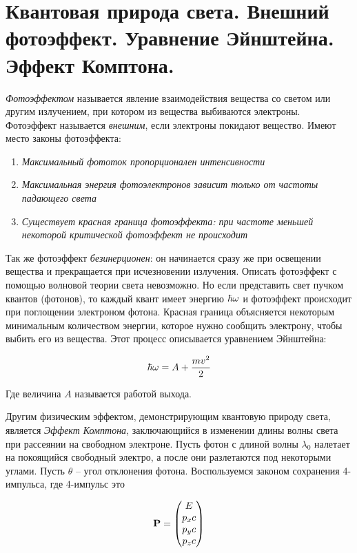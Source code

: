 \section{Квантовая природа света. Внешний фотоэффект. Уравнение Эйнштейна. Эффект Комптона.}

\textit{Фотоэффектом} называется явление взаимодействия вещества со светом или другим излучением, при котором из вещества выбиваются электроны. Фотоэффект называется \textit{внешним}, если электроны покидают вещество. Имеют место законы фотоэффекта:

\begin{enumerate}
    \item \textit{Максимальный фототок пропорционален интенсивности}
    \item \textit{Максимальная энергия фотоэлектронов зависит только от частоты падающего света}
    \item \textit{Существует красная граница фотоэффекта: при частоте меньшей некоторой критической фотоэффект не происходит}
\end{enumerate}

Так же фотоэффект \textit{безинерционен}: он начинается сразу же при освещении вещества и прекращается при исчезновении излучения. Описать фотоэффект с помощью волновой теории света невозможно. Но если представить свет пучком квантов (фотонов), то каждый квант имеет энергию $\hbar \omega$ и фотоэффект происходит при поглощении электроном фотона. Красная граница объясняется некоторым минимальным количеством энергии, которое нужно сообщить электрону, чтобы выбить его из вещества. Этот процесс описывается уравнением Эйнштейна:

\begin{equation}
    \hbar \omega = A + \frac{m v^2}{2}
\end{equation}

\noindent
Где величина $A$ называется работой выхода.

Другим физическим эффектом, демонстрирующим квантовую природу света, является \textit{Эффект Комптона}, заключающийся в изменении длины волны света при рассеянии на свободном электроне. Пусть фотон с длиной волны $\lambda_0$ налетает на покоящийся свободный электро, а после они разлетаются под некоторыми углами. Пусть $\theta$ -- угол отклонения фотона. Воспользуемся законом сохранения 4-импульса, где 4-импульс это

\begin{equation*}
    \mathbf P = \begin{pmatrix}
        E \\
        p_x c \\
        p_y c \\
        p_z c
    \end{pmatrix}
\end{equation*}

